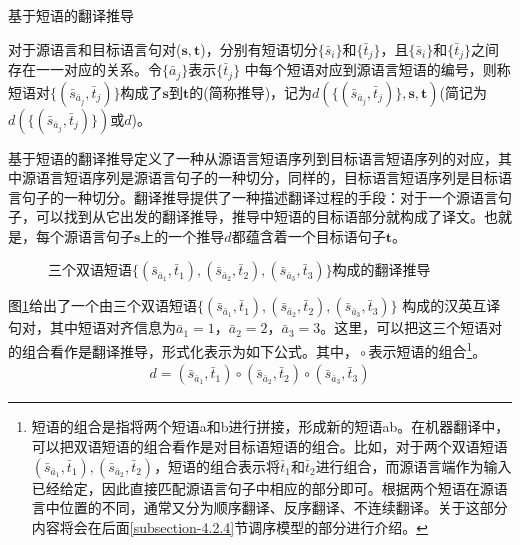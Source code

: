 \vspace{0.5em}
\begin{definition} 基于短语的翻译推导

{\small
对于源语言和目标语言句对($\mathbf{s}, \mathbf{t}$)，分别有短语切分$\{\bar{s}_i\}$和$\{\bar{t}_j\}$，且$\{\bar{s}_i\}$和$\{\bar{t}_j\}$之间存在一一对应的关系。令$\{\bar{a}_j\}$表示$\{\bar{t}_j\}$ 中每个短语对应到源语言短语的编号，则称短语对$\{(\bar{s}_{\bar{a}_j},\bar{t}_j)\}$构成了$\mathbf{s}$到$\mathbf{t}$的{\small{}}(简称推导)，记为$d(\{(\bar{s}_{\bar{a}_j},\bar{t}_j)\},\mathbf{s},\mathbf{t})$(简记为$d(\{(\bar{s}_{\bar{a}_j},\bar{t}_j)\})$或$d$)。
}
\end{definition}

\parinterval 基于短语的翻译推导定义了一种从源语言短语序列到目标语言短语序列的对应，其中源语言短语序列是源语言句子的一种切分，同样的，目标语言短语序列是目标语言句子的一种切分。翻译推导提供了一种描述翻译过程的手段：对于一个源语言句子，可以找到从它出发的翻译推导，推导中短语的目标语部分就构成了译文。也就是，每个源语言句子$\mathbf{s}$上的一个推导$d$都蕴含着一个目标语句子$\mathbf{t}$。

\begin{figure}[htp]
\centering

\caption{三个双语短语$\{(\bar{s}_{\bar{a}_1},\bar{t}_1),(\bar{s}_{\bar{a}_2},\bar{t}_2),(\bar{s}_{\bar{a}_3},\bar{t}_3)\}$构成的翻译推导}
\label{fig:4-10}
\end{figure}

\parinterval 图\ref{fig:4-10}给出了一个由三个双语短语$\{(\bar{s}_{\bar{a}_1},\bar{t}_1),(\bar{s}_{\bar{a}_2},\bar{t}_2),(\bar{s}_{\bar{a}_3},\bar{t}_3)\}$ 构成的汉英互译句对，其中短语对齐信息为$\bar{a}_1 = 1$，$\bar{a}_2 = 2$，$\bar{a}_3 = 3$。这里，可以把这三个短语对的组合看作是翻译推导，形式化表示为如下公式。其中，${} \circ $表示短语的组合\footnote[2]{短语的组合是指将两个短语a和b进行拼接，形成新的短语ab。在机器翻译中，可以把双语短语的组合看作是对目标语短语的组合。比如，对于两个双语短语$(\bar{s}_{\bar{a}_1},\bar{t}_1),(\bar{s}_{\bar{a}_2},\bar{t}_2)$，短语的组合表示将$\bar{t}_1$和$\bar{t}_2$进行组合，而源语言端作为输入已经给定，因此直接匹配源语言句子中相应的部分即可。根据两个短语在源语言中位置的不同，通常又分为顺序翻译、反序翻译、不连续翻译。关于这部分内容将会在后面\ref{subsection-4.2.4}节调序模型的部分进行介绍。}。
\begin{eqnarray}
d = {(\bar{s}_{\bar{a}_1},\bar{t}_1)} \circ {(\bar{s}_{\bar{a}_2},\bar{t}_2)} \circ {(\bar{s}_{\bar{a}_3},\bar{t}_3)}
\label{eq:4-1}
\end{eqnarray}

